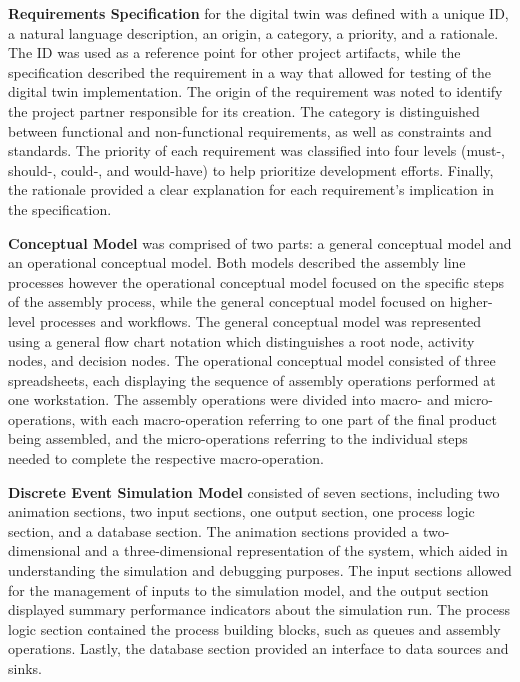 \documentclass{llncs}
\begin{document}
    \textbf{Requirements Specification} for the digital twin was defined with a unique ID, a natural language description, an origin, a category, a priority, and a rationale. The ID was used as a reference point for other project artifacts, while the specification described the requirement in a way that allowed for testing of the digital twin implementation. The origin of the requirement was noted to identify the project partner responsible for its creation.
     The category is distinguished between functional and non-functional requirements, as well as constraints and standards. The priority of each requirement was classified into four levels 
    (must-, should-, could-, and would-have) to help prioritize development efforts. 
    Finally, the rationale provided a clear explanation for each requirement's implication in the specification.

    \textbf{Conceptual Model} was comprised of two parts: a general conceptual model and an operational conceptual model. 
    Both models described the assembly line processes however the operational conceptual model focused on the specific steps of the assembly process, while the general conceptual model focused on higher-level processes and workflows.
    The general conceptual model was represented using a general flow chart notation which distinguishes a root node, activity nodes, and decision nodes.
    The operational conceptual model consisted of three spreadsheets, each displaying the sequence of assembly operations performed at one workstation. 
    The assembly operations were divided into macro- and micro-operations, with each macro-operation referring 
    to one part of the final product being assembled, and the micro-operations referring to the individual steps needed to complete the respective macro-operation.

    \textbf{Discrete Event Simulation Model} consisted of seven sections, including two animation sections, two input sections, one output section, one process logic section, and a database section. 
    The animation sections provided a two-dimensional and a three-dimensional representation of the system, 
    which aided in understanding the simulation and debugging purposes. The input sections allowed for the management of inputs to the simulation model, and the output section displayed summary performance indicators about the simulation run. 
    The process logic section contained the process building blocks, such as queues and assembly operations. Lastly, the database section provided an interface to data sources and sinks.
    
\end{document}
